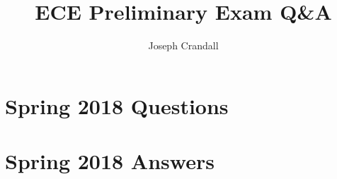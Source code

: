 
\usepackage{algorithm, algpseudocode, chemformula, color, gensymb, siunitx, soul, subfiles}
\usepackage[a4paper, total={7.5in, 10in}]{geometry}

\title{ECE Preliminary Exam Q\&A}
\author{Joseph Crandall}


\maketitle

\section{Spring 2018 Questions}


\section{Spring 2018 Answers}



